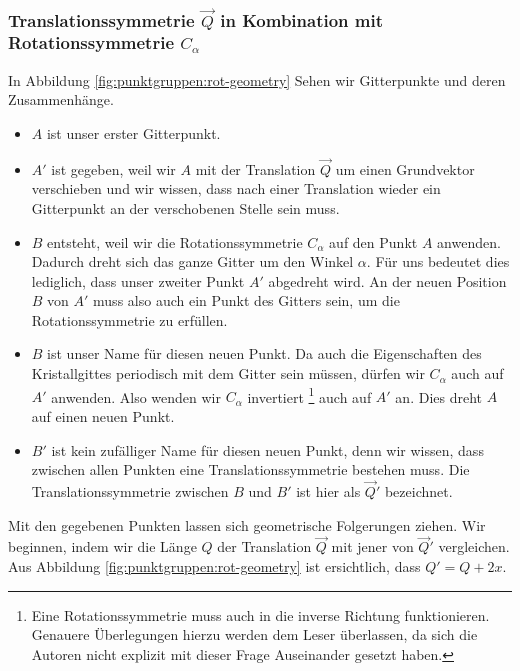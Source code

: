  \subsubsection{Translationssymmetrie \(\vec{Q}\) in Kombination mit Rotationssymmetrie \(C_\alpha\)}     %
 In Abbildung \ref{fig:punktgruppen:rot-geometry} Sehen wir Gitterpunkte und deren Zusammenhänge.

 \begin{itemize}
     \item  \(A\) ist unser erster Gitterpunkt. 

     \item  \(A'\) ist gegeben, weil wir \(A\) mit der Translation \(\vec{Q}\) um einen Grundvektor verschieben und wir wissen, dass nach einer Translation wieder ein Gitterpunkt an der verschobenen Stelle sein muss.
     \item \(B\) entsteht, weil wir die Rotationssymmetrie \(C_\alpha\) auf den Punkt \(A\) anwenden.
         Dadurch dreht sich das ganze Gitter um den Winkel \(\alpha\). 
         Für uns bedeutet dies lediglich, dass unser zweiter Punkt \(A'\) abgedreht wird.
         An der neuen Position \(B\) von \(A'\) muss also auch ein Punkt des Gitters sein, um die Rotationssymmetrie zu erfüllen.
     \item \(B\) ist unser Name für diesen neuen Punkt.
         Da auch die Eigenschaften des Kristallgittes periodisch mit dem Gitter sein müssen, dürfen wir \(C_\alpha\) auch auf \(A'\) anwenden.
         Also wenden wir \(C_\alpha\) invertiert
         \footnote{Eine Rotationssymmetrie muss auch in die inverse Richtung funktionieren.
         Genauere Überlegungen hierzu werden dem Leser überlassen, da sich die Autoren nicht explizit mit dieser Frage Auseinander gesetzt haben.} 
         auch auf \(A'\) an. 
         Dies dreht \(A\) auf einen neuen Punkt.
     \item \(B'\) ist kein zufälliger Name für diesen neuen Punkt, denn wir wissen, dass zwischen allen Punkten eine Translationssymmetrie bestehen muss.
         Die Translationssymmetrie zwischen \(B\) und \(B'\) ist hier als \(\vec{Q}'\) bezeichnet.
 \end{itemize}  
 Mit den gegebenen Punkten lassen sich geometrische Folgerungen ziehen.
 Wir beginnen, indem wir die Länge \(Q\) der Translation \(\vec{Q}\) mit jener von \(\vec{Q}'\) vergleichen.
 Aus Abbildung \ref{fig:punktgruppen:rot-geometry} ist ersichtlich, dass \(Q' = Q + 2x\).
